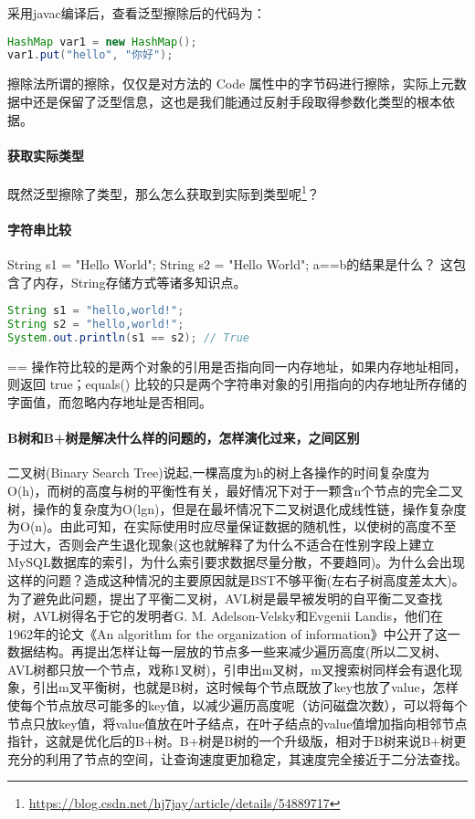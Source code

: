 \documentclass[../../../interview-questions.tex]{subfiles}
\begin{document}
采用javac编译后，查看泛型擦除后的代码为：

\begin{lstlisting}[language=Java]
HashMap var1 = new HashMap();
var1.put("hello", "你好");
\end{lstlisting}

擦除法所谓的擦除，仅仅是对方法的 Code 属性中的字节码进行擦除，实际上元数据中还是保留了泛型信息，这也是我们能通过反射手段取得参数化类型的根本依据。

\paragraph{获取实际类型}

既然泛型擦除了类型，那么怎么获取到实际到类型呢\footnote{\url{https://blog.csdn.net/hj7jay/article/details/54889717}}？

\paragraph{字符串比较}

String s1 = "Hello World"; String s2 = "Hello World"; a==b的结果是什么？ 这包含了内存，String存储方式等诸多知识点。

\begin{lstlisting}[language=Java]
String s1 = "hello,world!";
String s2 = "hello,world!";
System.out.println(s1 == s2); // True
\end{lstlisting}

== 操作符比较的是两个对象的引用是否指向同一内存地址，如果内存地址相同，则返回 true；equals() 比较的只是两个字符串对象的引用指向的内存地址所存储的字面值，而忽略内存地址是否相同。

\paragraph{B树和B+树是解决什么样的问题的，怎样演化过来，之间区别}

二叉树(Binary Search Tree)说起,一棵高度为h的树上各操作的时间复杂度为O(h)，而树的高度与树的平衡性有关，最好情况下对于一颗含n个节点的完全二叉树，操作的复杂度为O(lgn)，但是在最坏情况下二叉树退化成线性链，操作复杂度为O(n)。由此可知，在实际使用时应尽量保证数据的随机性，以使树的高度不至于过大，否则会产生退化现象(这也就解释了为什么不适合在性别字段上建立MySQL数据库的索引，为什么索引要求数据尽量分散，不要趋同)。为什么会出现这样的问题？造成这种情况的主要原因就是BST不够平衡(左右子树高度差太大)。为了避免此问题，提出了平衡二叉树，AVL树是最早被发明的自平衡二叉查找树，AVL树得名于它的发明者G. M. Adelson-Velsky和Evgenii Landis，他们在1962年的论文《An algorithm for the organization of information》中公开了这一数据结构。再提出怎样让每一层放的节点多一些来减少遍历高度(所以二叉树、AVL树都只放一个节点，戏称1叉树)，引申出m叉树，m叉搜索树同样会有退化现象，引出m叉平衡树，也就是B树，这时候每个节点既放了key也放了value，怎样使每个节点放尽可能多的key值，以减少遍历高度呢（访问磁盘次数），可以将每个节点只放key值，将value值放在叶子结点，在叶子结点的value值增加指向相邻节点指针，这就是优化后的B+树。B+树是B树的一个升级版，相对于B树来说B+树更充分的利用了节点的空间，让查询速度更加稳定，其速度完全接近于二分法查找。
\end{document}
